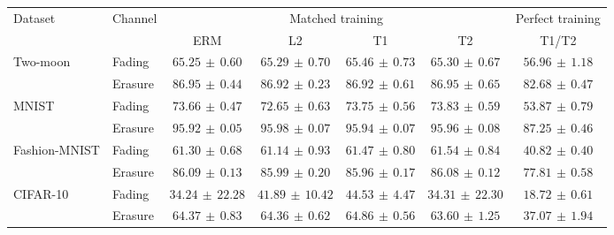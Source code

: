 \begin{tabular*}{\linewidth}{@{\extracolsep{\fill}}llccccc@{}}
\toprule
\multirow{2}{*}{Dataset} & \multirow{2}{*}{Channel} & \multicolumn{4}{c}{Matched training} & Perfect training \\
\cmidrule(lr){3-6}\cmidrule(l){7-7}
 & & ERM & L2 & T1 & T2 & T1/T2 \\
\midrule
\multirow{2}{*}{Two-moon} & Fading & $65.25\,\pm\,0.60$ & $65.29\,\pm\,0.70$ & $\mathbf{65.46}\,\pm\,0.73$ & $65.30\,\pm\,0.67$ & $56.96\,\pm\,1.18$ \\
 & Erasure & $86.95\,\pm\,0.44$ & $86.92\,\pm\,0.23$ & $86.92\,\pm\,0.61$ & $\mathbf{86.95}\,\pm\,0.65$ & $82.68\,\pm\,0.47$ \\
\midrule[0.25pt]
\multirow{2}{*}{MNIST} & Fading & $73.66\,\pm\,0.47$ & $72.65\,\pm\,0.63$ & $73.75\,\pm\,0.56$ & $\mathbf{73.83}\,\pm\,0.59$ & $53.87\,\pm\,0.79$ \\
 & Erasure & $95.92\,\pm\,0.05$ & $\mathbf{95.98}\,\pm\,0.07$ & $95.94\,\pm\,0.07$ & $95.96\,\pm\,0.08$ & $87.25\,\pm\,0.46$ \\
\midrule[0.25pt]
\multirow{2}{*}{Fashion-MNIST} & Fading & $61.30\,\pm\,0.68$ & $61.14\,\pm\,0.93$ & $61.47\,\pm\,0.80$ & $\mathbf{61.54}\,\pm\,0.84$ & $40.82\,\pm\,0.40$ \\
 & Erasure & $\mathbf{86.09}\,\pm\,0.13$ & $85.99\,\pm\,0.20$ & $85.96\,\pm\,0.17$ & $86.08\,\pm\,0.12$ & $77.81\,\pm\,0.58$ \\
\midrule[0.25pt]
\multirow{2}{*}{CIFAR-10} & Fading & $34.24\,\pm\,22.28$ & $41.89\,\pm\,10.42$ & $\mathbf{44.53}\,\pm\,4.47$ & $34.31\,\pm\,22.30$ & $18.72\,\pm\,0.61$ \\
 & Erasure & $64.37\,\pm\,0.83$ & $64.36\,\pm\,0.62$ & $\mathbf{64.86}\,\pm\,0.56$ & $63.60\,\pm\,1.25$ & $37.07\,\pm\,1.94$ \\
\bottomrule
\end{tabular*}
